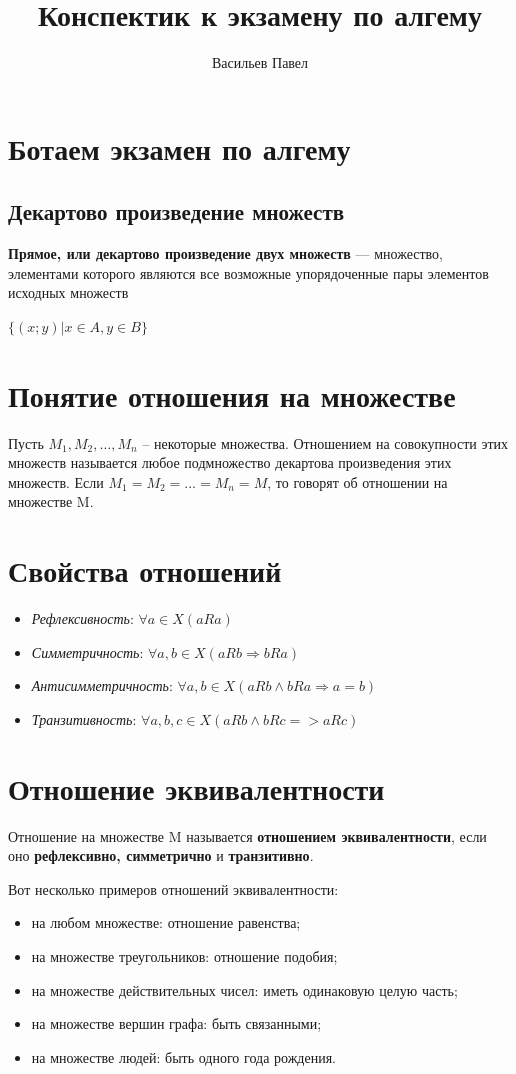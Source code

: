 \documentclass[a4paper]{article}
\title{Конспектик к экзамену по алгему}
\author{Васильев Павел}
\begin{document}
{
\begin{small}
\section*{Ботаем экзамен по алгему}
\subsection*{Декартово произведение множеств}

\textbf{Прямое, или декартово произведение двух множеств} — множество, элементами которого являются все возможные упорядоченные пары элементов исходных множеств

$\{ (x;y) | x \in A, y \in B \}$

\section*{Понятие отношения на множестве
}
Пусть $M_1, M_2, …, M_n$ – некоторые множества.
Отношением на совокупности этих множеств называется любое подмножество
декартова произведения этих множеств. Если $M_1 = M_2 = … = M_n = M$, то говорят об отношении на множестве M.

\section*{Свойства отношений}

\begin{itemize}
\item \textit{Рефлексивность}: $\forall a \in X (a R a)$
\item \textit{Симметричность}: $\forall a, b \in X (a R b \Rightarrow b R a)$
\item \textit{Антисимметричность}: $\forall a, b \in X (a R b \land b R a \Rightarrow a = b)$
\item \textit{Транзитивность}: $\forall a, b, c \in X (a R b \land b R c => a R c)$


\end{itemize}


\section*{Отношение эквивалентности
}
Отношение на множестве M называется \textbf{отношением
эквивалентности}, если оно \textbf{рефлексивно, симметрично} и \textbf{транзитивно}.

Вот несколько примеров отношений эквивалентности:
\begin{itemize}
\item на любом множестве: отношение равенства;
\item на множестве треугольников: отношение подобия;
\item на множестве действительных чисел: иметь одинаковую целую часть;
\item на множестве вершин графа: быть связанными;
\item на множестве людей: быть одного года рождения.
\end{itemize}



\end{small}}
\end{document}
